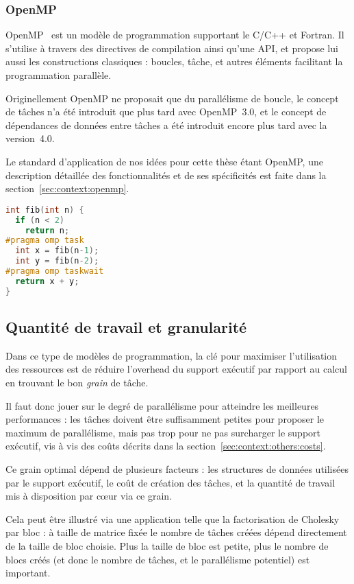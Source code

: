 \subsubsection{OpenMP}

OpenMP~\cite{openmp45} est un modèle de programmation supportant le C/C++ et Fortran.
Il s'utilise à travers des directives de compilation ainsi qu'une API, et propose lui aussi les constructions classiques : boucles, tâche, et autres éléments facilitant la programmation parallèle.

Originellement OpenMP ne proposait que du parallélisme de boucle, le concept de tâches n'a été introduit que plus tard avec OpenMP~3.0, et le concept de dépendances de données entre tâches a été introduit encore plus tard avec la version~4.0.

Le standard d'application de nos idées pour cette thèse étant OpenMP, une description détaillée des fonctionnalités et de ses spécificités est faite dans la section~\ref{sec:context:openmp}.

\begin{lstlisting}[language=c++,caption=Fibonacci exprimé en OpenMP,label=lst:context:openmp,basicstyle=\small]
int fib(int n) {
  if (n < 2)
    return n;
#pragma omp task
  int x = fib(n-1);
  int y = fib(n-2);
#pragma omp taskwait
  return x + y;
}
\end{lstlisting}

\subsection{Quantité de travail et granularité}\label{sec:context:others:granularity}


Dans ce type de modèles de programmation, la clé pour maximiser l'utilisation des ressources est de réduire l'overhead du support exécutif par rapport au calcul en trouvant le bon \emph{grain} de tâche.

Il faut donc jouer sur le degré de parallélisme pour atteindre les meilleures performances : les tâches doivent être suffisamment petites pour proposer le maximum de parallélisme, mais pas trop pour ne pas surcharger le support exécutif, vis à vis des coûts décrits dans la section~\ref{sec:context:others:costs}.

Ce grain optimal dépend de plusieurs facteurs : les structures de données utilisées par le support exécutif, le coût de création des tâches, et la quantité de travail mis à disposition par cœur via ce grain.

Cela peut être illustré via une application telle que la factorisation de Cholesky par bloc : à taille de matrice fixée le nombre de tâches créées dépend directement de la taille de bloc choisie.
Plus la taille de bloc est petite, plus le nombre de blocs créés (et donc le nombre de tâches, et le parallélisme potentiel) est important.

